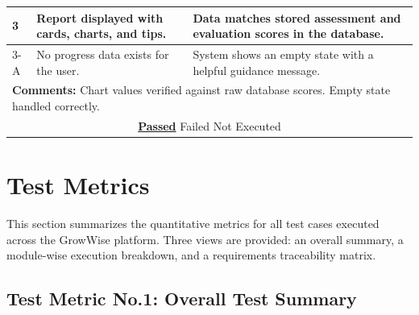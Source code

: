 \documentclass{FastFyp}
\begin{document}
\begin{table}[H]
\begin{tabular}{|p{2.5cm}|p{4cm}|p{2.5cm}|p{4.5cm}|}
3 & Report displayed with cards, charts, and tips. & \multicolumn{2}{p{7cm}|}{Data matches stored assessment and evaluation scores in the database.} \\ \hline
3-A & No progress data exists for the user. & \multicolumn{2}{p{7cm}|}{System shows an empty state with a helpful guidance message.} \\ \hline
\multicolumn{4}{|p{13.5cm}|}{\textbf{Comments:} Chart values verified against raw database scores. Empty state handled correctly.} \\ \hline
\multicolumn{4}{|c|}{\underline{\textbf{Passed}} \quad\quad\quad Failed \quad\quad\quad Not Executed} \\ \hline
\end{tabular}
\end{table}

\FloatBarrier

\section{Test Metrics}

This section summarizes the quantitative metrics for all test cases executed across the GrowWise platform. Three views are provided: an overall summary, a module-wise execution breakdown, and a requirements traceability matrix.

\subsection{Test Metric No.1: Overall Test Summary}
\end{document}
